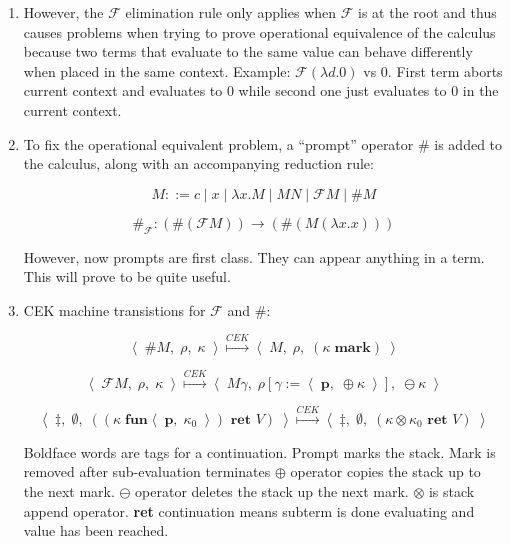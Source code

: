 \documentclass[letterpaper]{llncs}
\newcommand{\F}{ \ensuremath{ \mathcal{F} } }
\newcommand{\cek}[3]{ \ensuremath{ \left\langle \; #1, \; #2, \; #3 \; \right\rangle } }
\newcommand{\cekstep}{ \ensuremath{ \stackrel{CEK}{\longmapsto} } }
\newcommand{\clos}[2]{ \ensuremath{ \left\langle \; #1, \; #2 \; \right\rangle } }
\begin{document}
\begin{enumerate}
	\item However, the $\F$ elimination rule only applies when $\F$ is at the root and thus causes problems when trying to prove operational equivalence of the calculus because two terms that evaluate to the same value can behave differently when placed in the same context. Example: $\F (\lambda d.0)$ vs 0. First term aborts current context and evaluates to 0 while second one just evaluates to 0 in the current context.
	
	\item To fix the operational equivalent problem, a ``prompt'' operator \# is added to the calculus, along with an accompanying reduction rule:
	
	$$M ::= c \mid x \mid \lambda x.M \mid M N \mid \F M \mid \# M$$

	$$\#_\F: (\# (\F M)) \rightarrow (\# (M (\lambda x.x)))$$
	
	However, now prompts are first class. They can appear anything in a term. This will prove to be quite useful.
	
	\item CEK machine transistions for $\F$ and \#:
	
	$$\cek{ \# M }{ \rho }{ \kappa } 
	      \cekstep 
	  \cek{ M }{ \rho }{ (\kappa \; \textbf{mark}) }$$
	
	$$\cek{ \F M }{ \rho }{ \kappa } 
	      \cekstep 
	  \cek{ M \gamma }{ \rho[\gamma := \clos{ \textbf{p} }{ \oplus \kappa }] }{ \ominus \kappa }$$
	  
	$$\cek{ \ddagger }{ \emptyset }{ ((\kappa \; \textbf{fun} \clos{\textbf{p}}{\kappa_0}) \textbf{ ret } V) } 
	      \cekstep
	  \cek{ \ddagger }{ \emptyset }{ (\kappa \otimes \kappa_0 \textbf{ ret } V) }$$
	
	Boldface words are tags for a continuation. Prompt marks the stack. Mark is removed after sub-evaluation terminates $\oplus$ operator copies the stack up to the next mark. $\ominus$ operator deletes the stack up the next mark. $\otimes$ is stack append operator. \textbf{ret} continuation means subterm is done evaluating and value has been reached.
	

\end{enumerate}
\end{document}
